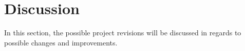 \section{Discussion}
In this section, the possible project revisions will be discussed in regards to possible changes and improvements.


